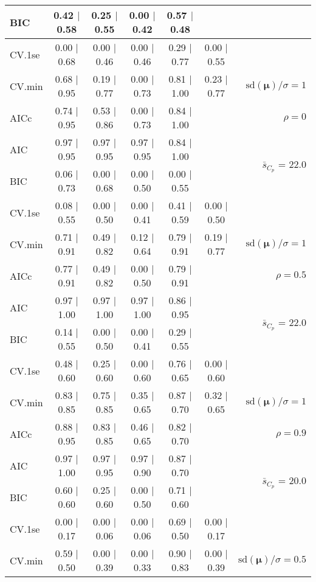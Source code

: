 \documentclass[12pt]{article}
\newcommand{\mr}[1]{\mathrm{#1}}
\newcommand{\bm}[1]{\mathbf{#1}}
\begin{document}
\begin{table}[p]
\begin{center}
\begin{tabular}{l*{5}{c}|r}
BIC & 0.42 $\mid$ 0.58 & 0.25 $\mid$ 0.55 & 0.00 $\mid$ 0.42 & 0.57 $\mid$ 0.48 & & \\
 \hline 
CV.1se & 0.00 $\mid$ 0.68 & 0.00 $\mid$ 0.46 & 0.00 $\mid$ 0.46 & 0.29 $\mid$ 0.77 & 0.00 $\mid$ 0.55 &\\
CV.min & 0.68 $\mid$ 0.95 & 0.19 $\mid$ 0.77 & 0.00 $\mid$ 0.73 & 0.81 $\mid$ 1.00 & 0.23 $\mid$ 0.77 &  $\mr{sd}(\bm{\mu})/\sigma=1$ \\
AICc & 0.74 $\mid$ 0.95 & 0.53 $\mid$ 0.86 & 0.00 $\mid$ 0.73 & 0.84 $\mid$ 1.00 & & $\rho=0$ \\
AIC & 0.97 $\mid$ 0.95 & 0.97 $\mid$ 0.95 & 0.97 $\mid$ 0.95 & 0.84 $\mid$ 1.00 & & \multirow{2}{*}{$\bar{s}_{C_p}$ = 22.0} \\
BIC & 0.06 $\mid$ 0.73 & 0.00 $\mid$ 0.68 & 0.00 $\mid$ 0.50 & 0.00 $\mid$ 0.55 & & \\
 \hline 
CV.1se & 0.08 $\mid$ 0.55 & 0.00 $\mid$ 0.50 & 0.00 $\mid$ 0.41 & 0.41 $\mid$ 0.59 & 0.00 $\mid$ 0.50 &\\
CV.min & 0.71 $\mid$ 0.91 & 0.49 $\mid$ 0.82 & 0.12 $\mid$ 0.64 & 0.79 $\mid$ 0.91 & 0.19 $\mid$ 0.77 &  $\mr{sd}(\bm{\mu})/\sigma=1$ \\
AICc & 0.77 $\mid$ 0.91 & 0.49 $\mid$ 0.82 & 0.00 $\mid$ 0.50 & 0.79 $\mid$ 0.91 & & $\rho=0.5$ \\
AIC & 0.97 $\mid$ 1.00 & 0.97 $\mid$ 1.00 & 0.97 $\mid$ 1.00 & 0.86 $\mid$ 0.95 & & \multirow{2}{*}{$\bar{s}_{C_p}$ = 22.0} \\
BIC & 0.14 $\mid$ 0.55 & 0.00 $\mid$ 0.50 & 0.00 $\mid$ 0.41 & 0.29 $\mid$ 0.55 & & \\
 \hline 
CV.1se & 0.48 $\mid$ 0.60 & 0.25 $\mid$ 0.60 & 0.00 $\mid$ 0.60 & 0.76 $\mid$ 0.65 & 0.00 $\mid$ 0.60 &\\
CV.min & 0.83 $\mid$ 0.85 & 0.75 $\mid$ 0.85 & 0.35 $\mid$ 0.65 & 0.87 $\mid$ 0.70 & 0.32 $\mid$ 0.65 &  $\mr{sd}(\bm{\mu})/\sigma=1$ \\
AICc & 0.88 $\mid$ 0.95 & 0.83 $\mid$ 0.85 & 0.46 $\mid$ 0.65 & 0.82 $\mid$ 0.70 & & $\rho=0.9$ \\
AIC & 0.97 $\mid$ 1.00 & 0.97 $\mid$ 0.95 & 0.97 $\mid$ 0.90 & 0.87 $\mid$ 0.70 & & \multirow{2}{*}{$\bar{s}_{C_p}$ = 20.0} \\
BIC & 0.60 $\mid$ 0.60 & 0.25 $\mid$ 0.60 & 0.00 $\mid$ 0.50 & 0.71 $\mid$ 0.60 & & \\
 \hline 
CV.1se & 0.00 $\mid$ 0.17 & 0.00 $\mid$ 0.06 & 0.00 $\mid$ 0.06 & 0.69 $\mid$ 0.50 & 0.00 $\mid$ 0.17 &\\
CV.min & 0.59 $\mid$ 0.50 & 0.00 $\mid$ 0.39 & 0.00 $\mid$ 0.33 & 0.90 $\mid$ 0.83 & 0.00 $\mid$ 0.39 &  $\mr{sd}(\bm{\mu})/\sigma=0.5$ \\

\end{tabular}
\end{center}
\end{table}
\end{document}
